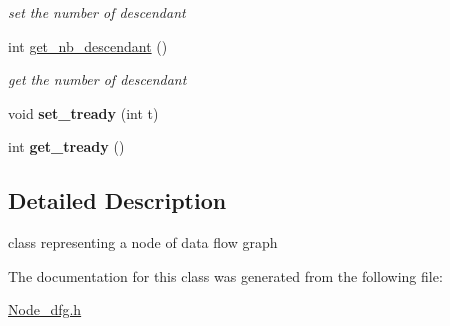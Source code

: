 \begin{DoxyCompactItemize}
\begin{DoxyCompactList}\small\item\em set the number of descendant \end{DoxyCompactList}\item 
\hypertarget{class_node__dfg_a9baa0a6be056b7d1ee290c404f2216f5}{int \hyperlink{class_node__dfg_a9baa0a6be056b7d1ee290c404f2216f5}{get\-\_\-nb\-\_\-descendant} ()}\label{class_node__dfg_a9baa0a6be056b7d1ee290c404f2216f5}

\begin{DoxyCompactList}\small\item\em get the number of descendant \end{DoxyCompactList}\item 
\hypertarget{class_node__dfg_ad9fe88cf90fa2282806edbc64f51331e}{void {\bfseries set\-\_\-tready} (int t)}\label{class_node__dfg_ad9fe88cf90fa2282806edbc64f51331e}

\item 
\hypertarget{class_node__dfg_a05e8db316dd2db8b0946167763585c7b}{int {\bfseries get\-\_\-tready} ()}\label{class_node__dfg_a05e8db316dd2db8b0946167763585c7b}

\end{DoxyCompactItemize}


\subsection{Detailed Description}
class representing a node of data flow graph 

The documentation for this class was generated from the following file\-:\begin{DoxyCompactItemize}
\item 
\hyperlink{_node__dfg_8h}{Node\-\_\-dfg.\-h}\end{DoxyCompactItemize}
